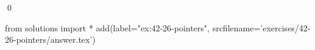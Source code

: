 
\begin{ex}
  \label{ex:42-26-pointers}
  
  \qed
\end{ex}
\begin{python0}
from solutions import *
add(label="ex:42-26-pointers",
    srcfilename='exercises/42-26-pointers/answer.tex')
\end{python0}

